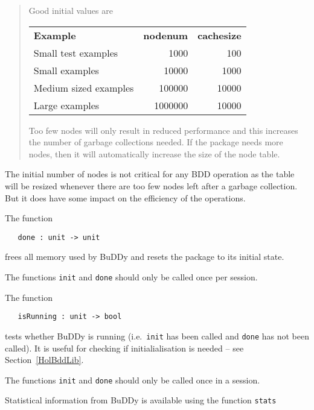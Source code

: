 \documentclass[12pt]{article}
\newcommand{\bnind}[1]{\index[MLbn]{#1}}
\renewcommand{\t}[1]{\mbox{\tt #1}}
\newcommand{\ml}[1]{{\tt #1}}
\newcommand{\Buddy}{BuDDy\xspace}
\begin{document}
\vspace*{-2mm}

{\baselineskip8pt\begin{quote}\footnotesize
Good initial values are

\smallskip

\begin{tabular}{lrr}
{\bf Example} & {\bf nodenum} & {\bf cachesize} \\
Small test examples   & 1000    & 100\\
Small examples        & 10000   & 1000 \\
Medium sized examples & 100000  & 10000\\
Large examples        & 1000000 & 10000
\end{tabular}

\smallskip

Too few nodes will only result in reduced performance and this
increases the number of garbage collections needed. If the package
needs more nodes, then it will automatically increase the size of the
node table.
\end{quote}}

The initial number of nodes is not critical for any BDD operation
as the table will be resized whenever there are too few nodes left
after a garbage collection.  But it does have some impact on the
efficiency of the operations.

The function

\begin{verbatim}
   done : unit -> unit
\end{verbatim}\bnind{\ml{done}}

frees all memory used by \Buddy{} and resets the
package to its initial state. 

The functions \t{init} and \t{done} should only be called once per session.

The function

\begin{verbatim}
   isRunning : unit -> bool
\end{verbatim}\bnind{\ml{isRunning}}

tests whether
\Buddy{} is running (i.e.~\t{init} has been called and \t{done} has not been called). It is
useful for checking if initialialisation is needed -- see Section~\ref{HolBddLib}.

The functions \t{init} and \t{done} should only be called once in a session.

Statistical information from \Buddy{} is available
using the function \t{stats}
\end{document}

